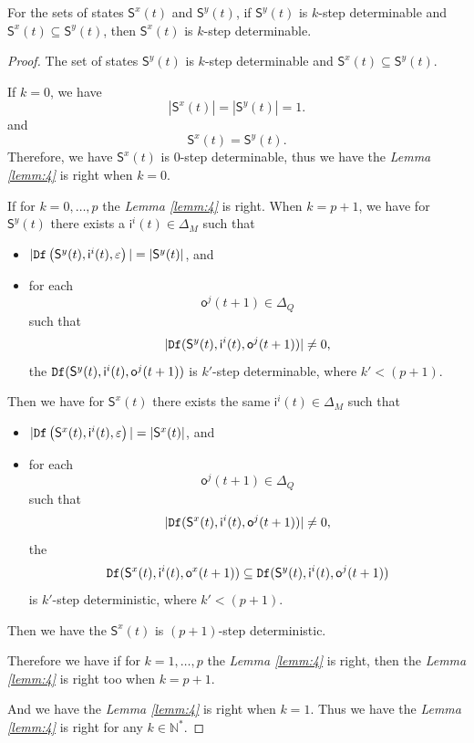 \begin{lemma}
For the sets of states $\mathsf{S}^{x}(t)$ and $\mathsf{S}^{y}(t)$, if $\mathsf{S}^{y}(t)$ is $k$-step determinable and $\mathsf{S}^{x}(t)\subseteq \mathsf{S}^{y}(t)$, then $\mathsf{S}^{x}(t)$ is $k$-step determinable.
  \label{lemm:4}
\end{lemma}
\begin{proof}
The set of states $\mathsf{S}^{y}(t)$ is $k$-step determinable and $\mathsf{S}^{x}(t)\subseteq \mathsf{S}^{y}(t)$. %

If $k=0$, we have \[|\mathsf{S}^{x}(t)|=|\mathsf{S}^{y}(t)|=1.\] and \[\mathsf{S}^{x}(t) = \mathsf{S}^{y}(t).\] Therefore, we have $\mathsf{S}^{x}(t)$ is $0$-step determinable, thus we have the {\em Lemma \ref{lemm:4}} is right when $k=0$.


 
 If for $k=0,\ldots, p$ the {\em Lemma \ref{lemm:4}} is right. When $k=p+1$, we have for $\mathsf{S}^{y}(t)$ there exists a $\mathsf{i}^{i}(t)\in \Delta_M$ such that
 \begin{itemize}
 \item  $|{\tt Df}\left(\mathsf{S}^{y}(t),\mathsf{i}^{i}(t),\varepsilon\right)|=|\mathsf{S}^{y}(t)|$, and 
 \item  for each \[\mathsf{o}^{j}(t+1)\in \Delta_Q\] such that \[|{\tt Df}(\mathsf{S}^{y}(t),\mathsf{i}^{i}(t),\mathsf{o}^{j}(t+1))|\neq 0,\] the ${\tt Df}(\mathsf{S}^{y}(t),\mathsf{i}^{i}(t),\mathsf{o}^{j}(t+1))$ is $k'$-step determinable, where ${k'}<(p+1)$.
 \end{itemize}
 Then we have for $\mathsf{S}^{x}(t)$ there exists the same $\mathsf{i}^{i}(t)\in \Delta_M$ such that
 \begin{itemize}
 \item  $|{\tt Df}\left(\mathsf{S}^{x}(t),\mathsf{i}^{i}(t),\varepsilon\right)|=|\mathsf{S}^{x}(t)|$, and 
 \item  for each \[\mathsf{o}^{j}(t+1)\in \Delta_Q\] such that \[|{\tt Df}(\mathsf{S}^{x}(t),\mathsf{i}^{i}(t),\mathsf{o}^{j}(t+1))|\neq 0,\] the \[{\tt Df}(\mathsf{S}^{x}(t),\mathsf{i}^{i}(t),\mathsf{o}^{x}(t+1))\subseteq {\tt Df}(\mathsf{S}^{y}(t),\mathsf{i}^{i}(t),\mathsf{o}^{j}(t+1))\] is  $k'$-step deterministic, where ${k'}<(p+1)$.
 \end{itemize}  Then we have the $\mathsf{S}^{x}(t)$ is $(p+1)$-step deterministic. 
 
 Therefore we have if for $k=1,\ldots, p$ the {\em Lemma \ref{lemm:4}} is right, then the {\em Lemma \ref{lemm:4}} is right too when $k=p+1$. 

And we have the {\em Lemma \ref{lemm:4}} is right when $k=1$. Thus we have the {\em Lemma \ref{lemm:4}} is right for any $k\in \mathbb{N}^*$.
 
\end{proof}


